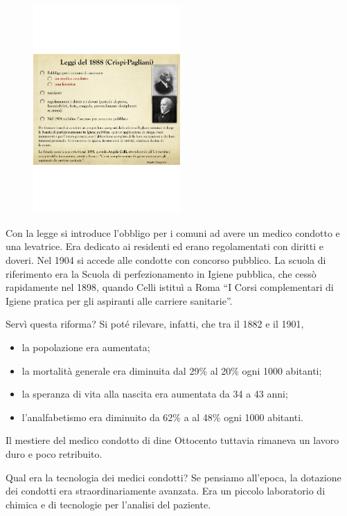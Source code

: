 \begin{figure}[!ht]
\centering
	\includegraphics[width=0.5\textwidth]{38/image2.png}
	\end{figure}
	
Con la legge si introduce l'obbligo per i comuni ad avere un medico
condotto e una levatrice. Era dedicato ai residenti ed erano
regolamentati con diritti e doveri. Nel 1904 si accede alle condotte con
concorso pubblico. La scuola di riferimento era la Scuola di
perfezionamento in Igiene pubblica, che cessò rapidamente nel 1898,
quando Celli istituì a Roma ``I Corsi complementari di Igiene pratica
per gli aspiranti alle carriere sanitarie''.

Servì questa riforma? Si poté rilevare, infatti, che tra il 1882 e il
1901,

\begin{itemize}
\item
  la popolazione era aumentata;
\item
  la mortalità generale era diminuita dal 29\% al 20\% ogni 1000
  abitanti;
\item
  la speranza di vita alla nascita era aumentata da 34 a 43 anni;
\item
  l'analfabetismo era diminuito da 62\% a al 48\% ogni 1000 abitanti.
\end{itemize}

Il mestiere del medico condotto di dine Ottocento tuttavia rimaneva un
lavoro duro e poco retribuito.

Qual era la tecnologia dei medici condotti? Se pensiamo all'epoca, la
dotazione dei condotti era straordinariamente avanzata. Era un piccolo
laboratorio di chimica e di tecnologie per l'analisi del paziente.

